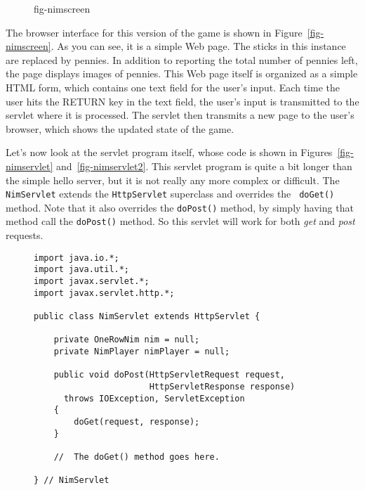 {{{{\begin{figure}[h!]
{fig-nimscreen}
\end{figure}

The browser interface for this version of the game is shown in
Figure~\ref{fig-nimscreen}. As you can see, it is a simple Web
page. The sticks in this instance are replaced by pennies. In addition
to reporting the total number of pennies left, the page displays
images of pennies. This Web page itself is organized as a simple HTML
form, which contains one text field for the user's input.  Each time
the user hits the RETURN key in the text field, the user's input is
transmitted to the servlet where it is processed.  The servlet then
transmits a new page to the user's browser, which shows the updated
state of the game. 

Let's now look at the servlet program itself, whose code is shown in
Figures~\ref{fig-nimservlet} and~\ref{fig-nimservlet2}.  This servlet
program is quite a bit longer than the simple hello server, but it is
not really any more complex or difficult.  The {\tt NimServlet}
extends the {\tt HttpServlet} superclass and overrides the {\tt
doGet()} method.  Note that it also overrides the {\tt doPost()}
method, by simply having that method call the {\tt doPost()} method. So
this servlet will work for both {\em get} and {\em post} requests.

\begin{figure}[tb]
\jjjprogstart
\begin{jjjlisting}
\begin{lstlisting}
import java.io.*;
import java.util.*;
import javax.servlet.*;
import javax.servlet.http.*;

public class NimServlet extends HttpServlet {
    
    private OneRowNim nim = null;
    private NimPlayer nimPlayer = null;

    public void doPost(HttpServletRequest request, 
                       HttpServletResponse response)
      throws IOException, ServletException
    {
        doGet(request, response);
    }

    //  The doGet() method goes here.

} // NimServlet
\end{lstlisting}
\end{jjjlisting}
\end{figure}

}}}}
